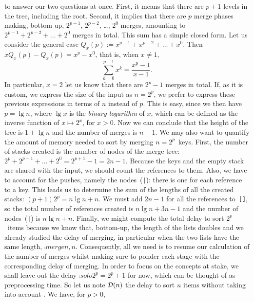 to answer our two questions at once. First, it means that there are
\(p+1\) levels in the tree, including the root. Second, it implies
that there are \(p\) merge phases making, bottom\hyp{}up, \(2^{p-1}\),
\(2^{p-2}\), \ldots, \(2^0\) merges, amounting to \(2^{p-1} + 2^{p-2}
+ \dots + 2^0\) merges in total. This sum has a simple closed
form. Let us consider the general case \(Q_x(p) := x^{p-1} +
x^{p-2} + \dots + x^0\). Then \(xQ_x(p) - Q_x(p) = x^p - x^0\), that
is, when \(x \neq 1\),
\begin{equation}
\sum_{k=0}^{p-1}{x^k} = \frac{x^p - 1}{x-1}.\label{eq:sum_power}
\end{equation}
In particular, \(x=2\) let us know that there are \(2^p-1\) merges in
total. If, as it is custom, we express the size of the input as
\(n=2^p\), we prefer to express these previous expressions in terms of
\(n\) instead of \(p\). This is easy, since we then have \(p = \lg
n\), where \(\lg x\) is the \emph{binary logarithm} of \(x\), which
can be defined as the inverse function of \(x \mapsto 2^x\), for \(x >
0\). Now we can conclude that the height of the tree is \(1 + \lg n\)
and the number of merges is \(n-1\). We may also want to quantify the
amount of memory needed to sort by merging \(n=2^p\)~keys. First, the
number of stacks created is the number of nodes of the merge tree:
\(2^p + 2^{p-1} + \ldots + 2^0 = 2^{p+1}-1 = 2n - 1\). Because the
keys and the empty stack are shared with the input, we should count
the references to them. Also, we have to account for the pushes,
namely the nodes~(\texttt{|}): there is one for each reference to a
key. This leads us to determine the sum of the lengths of all the
created stacks: \((p+1)2^p = n\lg n + n\). We must add \(2n - 1\) for
all the references to~\texttt{[]}, so the total number of references
created is \(n\lg n + 3n - 1\) and the number of nodes~(\texttt{|}) is
\(n\lg n + n\). Finally, we might compute the total delay to sort
\(2^p\)~items because we know that, bottom\hyp{}up, the length of the
lists doubles and we already studied the delay of merging, in
particular when the two lists have the same length,
\(\comp{merge}{n,n}\). Consequently, all we need is to resume our
calculation of the number of merges whilst making sure to ponder each
stage with the corresponding delay of merging. In order to focus on
the concepts at stake, we shall leave out the delay \(\comp{solo}{2^p}
= 2^p + 1\) for now, which can be thought of as preprocessing time. So
let us note \(\mathcal{D}(n)\) the delay to sort \(n\) items without
taking into account . We have, for \(p > 0\),
